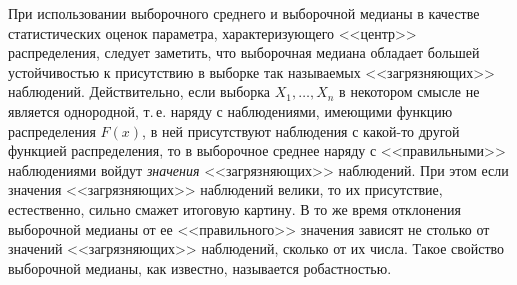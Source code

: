 \begin{multicols}{2}
\smallskip
При использовании выборочного среднего и выборочной медианы в
качестве статистических оценок параметра, характеризующего
<<центр>> распределения, следует заметить, что выборочная медиана
обладает большей устойчивостью к присутствию в выборке так
называемых <<загрязняющих>> наблюдений. Действительно, если
выборка $X_1,\ldots,X_n$ в некотором смысле не является
однородной, т.\,е. наряду с наблюдениями, имеющими функцию
распределения $F(x)$, в ней присутствуют наблюдения с какой-то
другой функцией распределения, то в выборочное среднее наряду с
<<правильными>> наблюдениями войдут {\it значения}
<<загрязняющих>> наблюдений. При этом если значения
<<за\-гряз\-ня\-ющих>> наблюдений велики, то их присутствие,
естественно, сильно смажет итоговую картину. В то же время
отклонения выборочной медианы от ее <<правильного>> значения
зависят не столько от значений <<загрязняющих>> наблюдений,
сколько от их числа. Такое свойство выборочной медианы, как
известно, называется робастностью.

\smallskip


\end{multicols}
